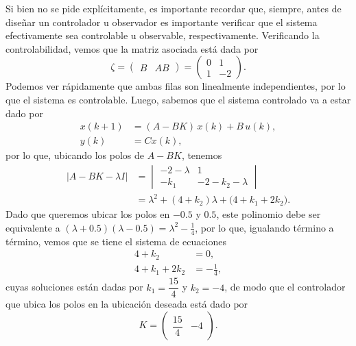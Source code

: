 \documentclass[
  11pt,
  letterpaper,
   addpoints,
  answers
  ]{exam}
\begin{document}
\begin{questions}
\begin{solution}
Si bien no se pide explícitamente, es importante recordar que, siempre, antes de diseñar un controlador u observador es importante verificar que el sistema efectivamente sea controlable u observable, respectivamente. Verificando la controlabilidad, vemos que la matriz asociada está dada por
\begin{equation}
\zeta=\begin{pmatrix}B & AB\end{pmatrix}=
\begin{pmatrix}
0 & 1\\
1 & -2
\end{pmatrix}.
\end{equation}
Podemos ver rápidamente que ambas filas son linealmente independientes, por lo que el sistema es controlable. Luego, sabemos que el sistema controlado va a estar dado por
\begin{align}
x(k+1) &= (A-BK)\,x(k)+B\,u(k),\\
y(k) &= Cx(k),
\end{align}
por lo que, ubicando los polos de $A-BK$, tenemos
\begin{align}
\lvert A-BK-\lambda I\rvert
&=
\begin{vmatrix}
-2-\lambda & 1\\
-k_{1} & -2-k_{2}-\lambda
\end{vmatrix}\\
&=\lambda^{2}+(4+k_{2})\lambda+\big(4+k_{1}+2k_{2}\big).
\end{align}
Dado que queremos ubicar los polos en $-0.5$ y $0.5$, este polinomio debe ser equivalente a $(\lambda+0.5)(\lambda-0.5)=\lambda^{2}-\frac{1}{4}$, por lo que, igualando término a término, vemos que se tiene el sistema de ecuaciones
\begin{align}
4+k_{2}&=0,\\
4+k_{1}+2k_{2}&=-\frac{1}{4},
\end{align}
cuyas soluciones están dadas por $k_{1}=\dfrac{15}{4}$ y $k_{2}=-4$, de modo que el controlador que ubica los polos en la ubicación deseada está dado por
\begin{equation}
K=\begin{pmatrix}\dfrac{15}{4} & -4\end{pmatrix}.
\end{equation}


\end{solution}
\end{questions}
\end{document}
